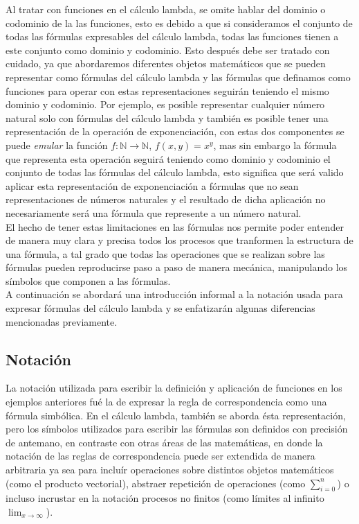 Al tratar con funciones en el cálculo lambda, se omite hablar del dominio o
codominio de la las funciones, esto es debido a que si consideramos el conjunto
de todas las fórmulas expresables del cálculo lambda, todas las funciones tienen
a este conjunto como dominio y codominio. Esto después debe ser tratado con
cuidado, ya que abordaremos diferentes objetos matemáticos que se pueden
representar como fórmulas del cálculo lambda y las fórmulas que definamos
como funciones para operar con estas representaciones seguirán teniendo el mismo
dominio y codominio. Por ejemplo, es posible representar cualquier número
natural solo con fórmulas del cálculo lambda y también es posible tener una
representación de la operación de exponenciación, con estas dos componentes se
puede \emph{emular} la función \(f : \mathbb{N} \to \mathbb{N}\),
\(f(x,y)=x^y\), mas sin embargo la fórmula que representa esta operación seguirá
teniendo como dominio y codominio el conjunto de todas las fórmulas del cálculo
lambda, esto significa que será valido aplicar esta representación de
exponenciación a fórmulas que no sean representaciones de números naturales y el
resultado de dicha aplicación no necesariamente será una fórmula que represente
a un número natural.\\

El hecho de tener estas limitaciones en las fórmulas nos permite poder entender
de manera muy clara y precisa todos los procesos que tranformen la estructura de
una fórmula, a tal grado que todas las operaciones que se realizan sobre las
fórmulas pueden reproducirse paso a paso de manera mecánica, manipulando los
símbolos que componen a las fórmulas.\\

A continuación se abordará una introducción informal a la notación usada para
expresar fórmulas del cálculo lambda y se enfatizarán algunas diferencias
mencionadas previamente.\\

\subsection{Notación}

La notación utilizada para escribir la definición y aplicación de funciones en
los ejemplos anteriores fué la de expresar la regla de correspondencia como una
fórmula simbólica. En el cálculo lambda, también se aborda ésta representación,
pero los símbolos utilizados para escribir las fórmulas son definidos con
precisión de antemano, en contraste con otras áreas de las matemáticas, en donde la
notación de las reglas de correspondencia puede ser extendida de manera
arbitraria ya sea para incluír operaciones sobre distintos objetos matemáticos
(como el producto vectorial), abstraer repetición de operaciones (como
\(\sum_{i=0}^n\)) o incluso incrustar en la notación procesos no finitos (como
límites al infinito \(\lim_{x\to \infty}\)).\\


